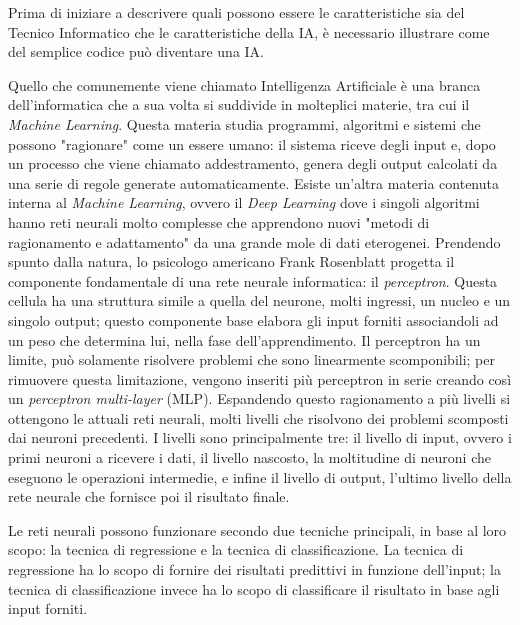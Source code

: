     \par
        Prima di iniziare a descrivere quali possono essere le caratteristiche sia del Tecnico Informatico che le caratteristiche della IA, è necessario illustrare come del semplice codice può diventare una IA.\newline
    \par
        Quello che comunemente viene chiamato Intelligenza Artificiale è una branca dell'informatica che a sua volta si suddivide in molteplici materie, tra cui il \textit{Machine Learning}. Questa materia studia programmi, algoritmi e sistemi che possono "ragionare" come un essere umano: il sistema riceve degli input e, dopo un processo che viene chiamato addestramento, genera degli output calcolati da una serie di regole generate automaticamente. Esiste un'altra materia contenuta interna al \textit{Machine Learning}, ovvero il \textit{Deep Learning} dove i singoli algoritmi hanno reti neurali molto complesse che apprendono nuovi "metodi di ragionamento e adattamento" da una grande mole di dati eterogenei. \newline
        Prendendo spunto dalla natura, lo psicologo americano Frank Rosenblatt progetta il componente fondamentale di una rete neurale informatica: il \textit{perceptron}. Questa cellula ha una struttura simile a quella del neurone, molti ingressi, un nucleo e un singolo output; questo componente base elabora gli input forniti associandoli ad un peso che determina lui, nella fase dell'apprendimento. \newline
        Il perceptron ha un limite, può solamente risolvere problemi che sono linearmente scomponibili; per rimuovere questa limitazione, vengono inseriti più perceptron in serie creando così un \textit{perceptron multi-layer} (MLP). Espandendo questo ragionamento a più livelli si ottengono le attuali reti neurali, molti livelli che risolvono dei problemi scomposti dai neuroni precedenti. I livelli sono principalmente tre: il livello di input, ovvero i primi neuroni a ricevere i dati, il livello nascosto, la moltitudine di neuroni che eseguono le operazioni intermedie, e infine il livello di output, l'ultimo livello della rete neurale che fornisce poi il risultato finale.
    \par
        Le reti neurali possono funzionare secondo due tecniche principali, in base al loro scopo: la tecnica di regressione e la tecnica di classificazione. La tecnica di regressione ha lo scopo di fornire dei risultati predittivi in funzione dell'input; la tecnica di classificazione invece ha lo scopo di classificare il risultato in base agli input forniti. \newline
